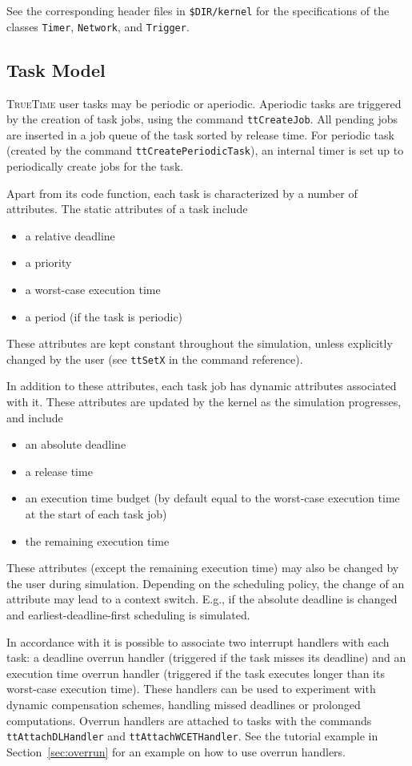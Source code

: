 \documentclass[final,twoside]{rapport}
\begin{document}
See the corresponding header files in \texttt{\$DIR/kernel} for the
specifications of the classes \texttt{Timer}, \texttt{Network}, and
\texttt{Trigger}. 

\subsection{Task Model}
\textsc{TrueTime} user tasks may be periodic or aperiodic. Aperiodic
tasks are triggered by the creation of task jobs, using the command
\texttt{ttCreateJob}. All pending jobs are inserted in a job queue of
the task sorted by release time. For periodic task (created by the
command \texttt{ttCreatePer\-iodicTask}), an internal timer is set up
to periodically create jobs for the task.

Apart from its code function, each task is characterized by a number of
attributes. The static attributes of a task include
\begin{itemize}
\item a relative deadline
\item a priority
\item a worst-case execution time
\item a period (if the task is periodic)
\end{itemize}
These attributes are kept constant throughout the simulation, unless
explicitly changed by the user (see \texttt{ttSetX} in the command
reference).

In addition to these attributes, each task job has dynamic
attributes associated with it. These attributes are updated by the
kernel as the simulation progresses, and include
\begin{itemize}
\item an absolute deadline
\item a release time
\item an execution time budget (by default equal to the worst-case
  execution time at the start of each task job)
\item the remaining execution time
\end{itemize}
These attributes (except the remaining execution time) may also be
changed by the user during simulation. Depending on the scheduling
policy, the change of an attribute may lead to a context switch. E.g.,
if the absolute deadline is changed and earliest-deadline-first
scheduling is simulated.

In accordance with \cite{rtsj2000} it is possible to associate two
interrupt handlers with each task: a deadline overrun handler
(triggered if the task misses its deadline) and an execution time
overrun handler (triggered if the task executes longer than its
worst-case execution time). These handlers can be used to experiment
with dynamic compensation schemes, handling missed deadlines or
prolonged computations. Overrun handlers are attached to tasks with
the commands \texttt{ttAttachDLHandler} and
\texttt{ttAttachWCETHandler}. See the tutorial example in
Section~\ref{sec:overrun} for an example on how to use overrun
handlers.
\end{document}
